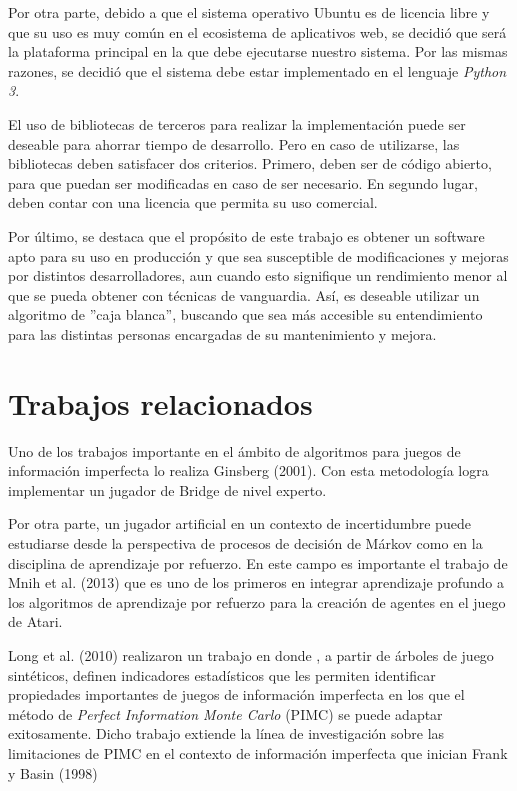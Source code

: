 Por otra parte, debido a que el sistema operativo Ubuntu es de licencia libre y
que su uso es muy común en el ecosistema de aplicativos web, se decidió que será
la plataforma principal en la que debe ejecutarse nuestro sistema. Por las
mismas razones, se decidió que el sistema debe estar implementado en el lenguaje
\textit{Python 3}.

El uso de bibliotecas de terceros para realizar la implementación puede ser
deseable para ahorrar tiempo de desarrollo. Pero en caso de utilizarse, las
bibliotecas deben satisfacer dos criterios. Primero, deben ser de código
abierto, para que puedan ser modificadas en caso de ser necesario. En segundo
lugar, deben contar con una licencia que permita su uso comercial.

Por último, se destaca que el propósito de este trabajo es obtener un software
apto para su uso en producción y que sea susceptible de modificaciones y mejoras
por distintos desarrolladores, aun cuando esto signifique un rendimiento menor
al que se pueda obtener con técnicas de vanguardia. Así, es deseable utilizar un
algoritmo de ''caja blanca'', buscando que sea más accesible su entendimiento
para las distintas personas encargadas de su mantenimiento y mejora.


\section{Trabajos relacionados}

Uno de los trabajos importante en el ámbito de algoritmos  para juegos de
información imperfecta lo realiza Ginsberg  (2001).  Con esta metodología logra
implementar un jugador de Bridge de nivel experto.

Por otra parte, un jugador artificial en un contexto de incertidumbre puede
estudiarse desde la perspectiva de procesos de decisión de Márkov como en la
disciplina de aprendizaje por refuerzo. En este campo es importante el trabajo
de Mnih et al. (2013) que es uno de los primeros en integrar aprendizaje
profundo a los algoritmos de aprendizaje por refuerzo para la creación de
agentes en el juego de Atari.

Long et al. (2010) realizaron un trabajo en donde , a partir de árboles de juego
sintéticos, definen indicadores estadísticos que les permiten identificar
propiedades importantes de juegos de información imperfecta en los que el método
de \textit{Perfect Information Monte Carlo} (PIMC)  se puede adaptar
exitosamente. Dicho trabajo extiende la línea de investigación sobre las
limitaciones de PIMC en el contexto de información imperfecta que inician Frank
y Basin (1998)

